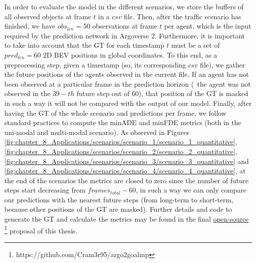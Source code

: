 In order to evaluate the model in the different scenarios, we store the buffers of all observed objects at frame $t$ in a $csv$ file. Then, after the traffic scenario has finished, we have $obs_{len}=50$ observations at frame $t$ per agent, which is the input required by the prediction network in Argoverse 2. Furthermore, it is important to take into account that the \ac{GT} for each timestamp $t$ must be a set of $pred_{len}=60$ 2D \ac{BEV} positions in global coordinates. To this end, as a preprocessing step, given a timestamp (so, its corresponding $csv$ file), we gather the future positions of the agents observed in the current file. If an agent has not been observed at a particular frame in the prediction horizon (\ie \ the agent was not observed in the $39-th$ future step out of 60), that position of the \ac{GT} is masked in such a way it will not be compared with the output of our model. Finally, after having the \ac{GT} of the whole scenario and predictions per frame, we follow standard practices to compute the \ac{minADE} and \ac{minFDE} metrics (both in the uni-modal and multi-modal scenario). As observed in Figures \ref{fig:chapter_8_Applications/scenarios/scenario_1/scenario_1_quantitative}, \ref{fig:chapter_8_Applications/scenarios/scenario_2/scenario_2_quantitative}, \ref{fig:chapter_8_Applications/scenarios/scenario_3/scenario_3_quantitative} and \ref{fig:chapter_8_Applications/scenarios/scenario_4/scenario_4_quantitative}, at the end of the scenarios the metrics are closed to zero since the number of future steps start decreasing from $frames_{total}-60$, in such a way we can only compare our predictions with the nearest future steps (from long-term to short-term, because other positions of the \ac{GT} are masked). Further details and code to generate the \ac{GT} and calculate the metrics may be found in the final \href{https://github.com/Cram3r95/argo2goalmp}{open-source} \footnote{https://github.com/Cram3r95/argo2goalmp} proposal of this thesis. 

\begin{table}[]
	\centering
	\captionsetup{justification=justified}
	\caption{Summary of use cases conducted in the \ac{CARLA} to study the domain adaptation of our efficient social-based \ac{MP} algorithm}
	\label{table:8_carla_use_cases}
\end{table} 

